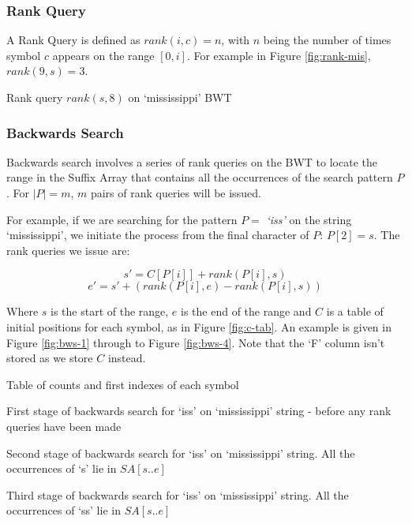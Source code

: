 \subsubsection{Rank Query} %
A Rank Query is defined as $rank(i, c) = n $, with $n$ being the number of
times symbol $c$ appears on the range $[0, i]$. For example in Figure
\ref{fig:rank-mis}, $rank(9, s) = 3$.

			{Rank query $rank(s, 8)$ on `mississippi' BWT}

\subsubsection{Backwards Search} %
Backwards search involves a series of rank queries on the BWT to locate the
range in the Suffix Array that contains all the occurrences of the search
pattern $P$. For $|P| = m$, $m$ pairs of rank queries will be issued.

For example, if we are searching for the pattern $P = $ \emph{`iss'} on the
string `mississippi', we initiate the process from the final character of $P$: 
$P[2] = s$. The rank queries we issue are:

					$$ s' = C[P[i]] + rank(P[i], s)$$
					$$ e' = s' + (rank(P[i], e) - rank(P[i], s))$$

Where $s$ is the start of the range, $e$ is the end of the range and $C$ is a
table of initial positions for each symbol, as in Figure \ref{fig:c-tab}. An
example is given in Figure \ref{fig:bws-1} through to Figure \ref{fig:bws-4}.
Note that the `F' column isn't stored as we store $C$ instead.


			{Table of counts and first indexes of each symbol}

			{First stage of backwards search for `iss' on `mississippi'
			 string - before any rank queries have been made}

			{Second stage of backwards search for `iss' on `mississippi'
			string. All the occurrences of `s' lie in $SA[s..e]$}

			{Third stage of backwards search for `iss' on `mississippi'
			string. All the occurrences of `ss' lie in $SA[s..e]$}

